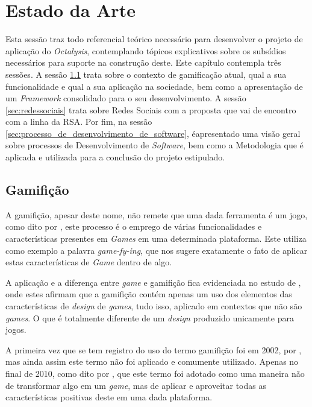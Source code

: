 \chapter[Estado da Arte]{Estado da Arte}
Esta sessão traz todo referencial teórico necessário para desenvolver o projeto
de aplicação do \textit{Octalysis}, contemplando tópicos explicativos sobre os subsídios
necessários para suporte na construção deste. Este capítulo contempla três sessões.
A sessão \ref{sec:gamifição} trata sobre o contexto de gamificação atual, qual a
sua funcionalidade e qual a sua aplicação na sociedade, bem como a apresentação
de um \textit{Framework} consolidado para o seu desenvolvimento. A sessão \ref{sec:redessociais}
trata sobre Redes Sociais com a proposta que vai de encontro com a linha da RSA.
Por fim, na sessão \ref{sec:processo_de_desenvolvimento_de_software},
éapresentado uma visão geral sobre processos de
Desenvolvimento de \textit{Software}, bem como a Metodologia que é aplicada e utilizada
para a conclusão do projeto estipulado.

\section{Gamifição}
\label{sec:gamifição}
A gamifição, apesar deste nome, não remete que uma dada ferramenta é um jogo,
como dito por \cite{popularitygamification}, este processo é o emprego de
várias funcionalidades e características presentes em \textit{Games} em uma determinada
plataforma. Este utiliza como exemplo a palavra \textit{game-fy-ing}, que nos sugere
exatamente o fato de aplicar estas características de \textit{Game} dentro de algo.

A aplicação e a diferença entre \textit{game} e gamifição fica evidenciada
no estudo de \cite{deterding2011gamification}, onde estes afirmam que a gamifição contém  apenas
um uso dos elementos das características de \textit{design} de \textit{games}, tudo isso,
aplicado em contextos que não são \textit{games}. O que é totalmente diferente
de um \textit{design} produzido unicamente para jogos.

A primeira vez que se tem registro do uso do termo gamifição foi em 2002,
por \cite{pelling}, mas ainda assim este termo não foi aplicado e comumente
utilizado. Apenas no final de 2010, como dito por \cite{deterding2011gamification}, que
este termo foi adotado como uma maneira não de transformar algo em um \textit{game},
mas de aplicar e aproveitar todas as características positivas deste em uma dada
plataforma.

